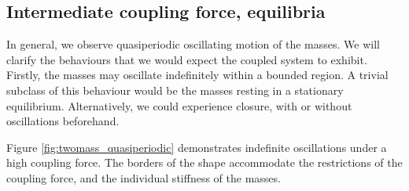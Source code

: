 \documentclass{article}
\begin{document}
\subsection{Intermediate coupling force, equilibria}

In general, we observe quasiperiodic oscillating motion of the masses.
We will clarify the behaviours that we would expect the coupled system to exhibit.
Firstly, the masses may oscillate indefinitely within a bounded region.
A trivial subclass of this behaviour would be the masses resting in a stationary equilibrium.
Alternatively, we could experience closure, with or without oscillations beforehand.

Figure \ref{fig:twomass_quasiperiodic} demonstrates indefinite oscillations under a high coupling force. 
The borders of the shape accommodate the restrictions of the coupling force,
and the individual stiffness of the masses.
\end{document}
